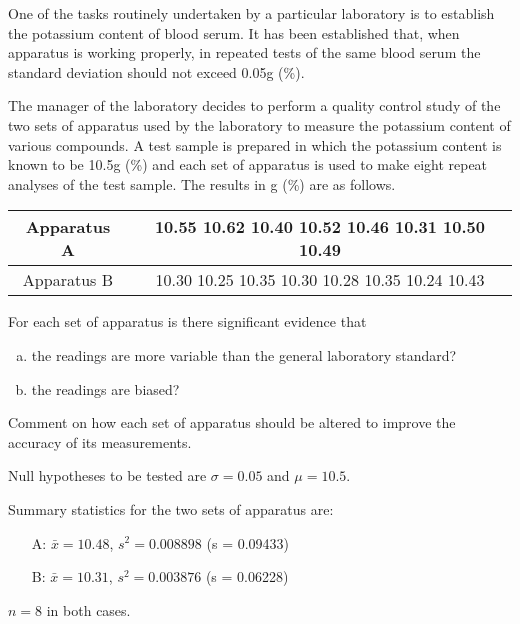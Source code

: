 \documentclass[a4paper,12pt]{article}
\begin{document}
	
	
	\large
	\noindent One of the tasks routinely undertaken by a particular laboratory is to establish the potassium content of blood serum.  It has been established that, when apparatus is working properly, in repeated tests of the same blood serum the standard deviation should not exceed 0.05g (\%). 
	
	The manager of the laboratory decides to perform a quality control study of the two sets of apparatus used by the laboratory to measure the potassium content of various compounds.  A test sample is prepared in which the potassium content is known to be 10.5g (\%) and each set of apparatus is used to make eight repeat analyses of the test sample.  The results in g (\%) are as follows. 
	
	\begin{center}
		
		\begin{tabular}{|c|c|}
			\hline
			Apparatus A & 10.55 10.62 10.40 10.52 10.46 10.31 10.50 10.49 \\ \hline
			Apparatus B & 10.30 10.25 10.35 10.30 10.28 10.35 10.24 10.43 \\ \hline
		\end{tabular}
	\end{center}
	
	\noindent For each set of apparatus is there significant evidence that 
	
	\begin{enumerate}[(a)]
		\item the readings are more variable than the general laboratory standard? 
		\item the readings are biased? 
		
	\end{enumerate} 
	
	
	Comment on how each set of apparatus should be altered to improve the accuracy of its measurements. 
	
	
	
	\begin{framed}
		\noindent Null hypotheses to be tested are $\sigma = 0.05$ and $\mu = 10.5$.\\ \medskip
		
		\noindent Summary statistics for the two sets of apparatus are:
		\begin{itemize}
			\item[A:] $\bar{x} = 10.48$, $s^2 = 0.008898$ (s = 0.09433)
			\item[B:] $\bar{x} = 10.31$, $s^2 = 0.003876$ (s = 0.06228)
		\end{itemize}
		$n = 8$ in both cases.
	\end{framed}
	
\end{document}
